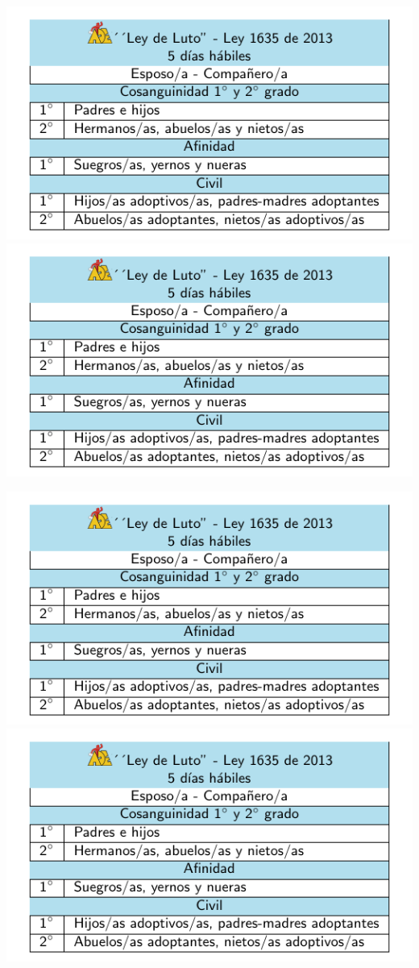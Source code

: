 \documentclass[10pt,letterpaper]{minimal}
\begin{document}
\begin{center}
\hspace{.5mm}\includegraphics[scale=1]{Tarjeta2.pdf} \includegraphics[scale=1]{Tarjeta2.pdf} \vspace{1.1mm}

\hspace{.5mm}\includegraphics[scale=1]{Tarjeta2.pdf} \includegraphics[scale=1]{Tarjeta2.pdf} \vspace{1.1mm}
\end{center}
\pagebreak
\end{document}
